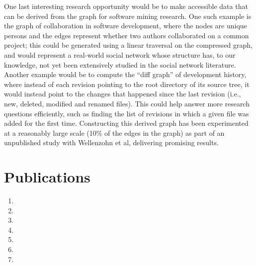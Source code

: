One last interesting research opportunity would be to make accessible data
that can be derived from the graph for software mining research. One such
example is the graph of collaboration in software development, where the nodes
are unique persons and the edges represent whether two authors collaborated on
a common project; this could be generated using a linear traversal on the
compressed graph, and would represent a real-world social network whose
structure has, to our knowledge, not yet been extensively studied in the
social network literature. Another example would be to compute the ``diff
graph'' of development history, where instead of each revision pointing to the
root directory of its source tree, it would instead point to the changes that
happened since the last revision (i.e., new, deleted, modified and renamed
files). This could help answer more research questions efficiently, such as
finding the list of revisions in which a given file was added for the first
time. Constructing this derived graph has been experimented at a reasonably
large scale (10\% of the edges in the graph) as part of an unpublished study
with Wellenzohn et al, delivering promising results.

\section{Publications}

\begin{enumerate}
    \item {}
    \item {}
    \item {}
    \item {}
    \item {}
    \item {}
    \item {}
\end{enumerate}
